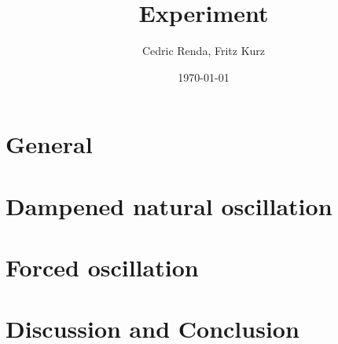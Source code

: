 \documentclass[12pt,a4paper]{article}
\title{Experiment}
\author{Cedric Renda, Fritz Kurz}
\date{\today }
\begin{document}
\maketitle


\tableofcontents

\section{General}



\section{Dampened natural oscillation}




\section{Forced oscillation}




\section{Discussion and Conclusion}


\newpage

\end{document}
